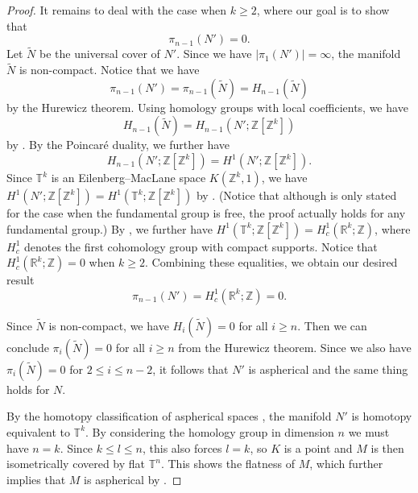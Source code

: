 \documentclass[11pt,letterpaper]{amsart}
\numberwithin{equation}{section}
\theoremstyle{definition}
\begin{document}
\begin{proof}
It remains to deal with the case when $k \ge 2$, where our goal is to show that
\begin{equation}\label{Eq: homotopy vanishing}
    \pi_{n-1}(N')=0.
\end{equation}
Let $\tilde{N}$ be the universal cover of $N'$. Since we have $|\pi_1(N')| =\infty$, the manifold $\tilde{N}$ is non-compact. Notice that we have
\begin{equation}\label{Eq: homotopy homology}
\pi_{n-1}(N') = \pi_{n-1}(\tilde{N}) = H_{n-1}(\tilde{N})
\end{equation}
 by the Hurewicz theorem.
Using homology groups with local coefficients, we have
$$H_{n-1}(\tilde{N}) = H_{n-1}(N'; \mathbb{Z}[\mathbb{Z}^k])$$ by \cite[Example 3H.2]{Hat02}. By the Poincar\'e duality, we further have $$H_{n-1}(N'; \mathbb{Z}[\mathbb{Z}^k]) = H^1(N'; \mathbb{Z}[\mathbb{Z}^k]).$$ Since $\mathbb{T}^{k}$ is an Eilenberg--MacLane space $K(\mathbb{Z}^k,1)$, we have $H^1(N'; \mathbb{Z}[\mathbb{Z}^k]) = H^1(\mathbb{T}^k; \mathbb{Z}[\mathbb{Z}^k])$ by \cite[Lemma 2.2]{GS09}. (Notice that although \cite[Lemma 2.2]{GS09} is only stated for the case when the fundamental group is free, the proof actually holds for any fundamental group.)
By \cite[Proposition 3H.5]{Hat02}, we further have $H^1(\mathbb{T}^k; \mathbb{Z}[\mathbb{Z}^k]) = H^1_c (\mathbb{R}^k; \mathbb{Z})$, where $H_c^1$ denotes the first cohomology group with compact supports. Notice that $H^1_c (\mathbb{R}^k; \mathbb{Z}) = 0$ when $k \ge 2$. Combining these equalities, we obtain our desired result
$$\pi_{n-1}(N') = H^1_c (\mathbb{R}^k; \mathbb{Z}) = 0.$$

Since $\tilde{N}$ is non-compact, we have $H_i(\tilde{N}) = 0$ for all $i \ge n$. Then we can conclude $\pi_i(\tilde{N}) = 0$ for all $i \ge n$ from the Hurewicz theorem. Since we also have $\pi_i(\tilde{N}) = 0$ for $2 \le i \le n-2$,  it follows that $N'$ is aspherical and the same thing holds for $N$.

By the homotopy classification of aspherical spaces \cite[Theorem 1.1]{Luc08}, the manifold $N'$ is homotopy equivalent to $\mathbb{T}^{k}$. By considering the homology group in dimension $n$ we must have $n = k$. Since $k \le l \le n$, this also forces $l = k$, so $K$ is a point and $M$ is then isometrically covered by flat $\mathbb{T}^n$. This shows the flatness of $M$, which further implies that $M$ is aspherical by {\cite[Theorem 4.6]{FW75}}.
\end{proof}
\end{document}
